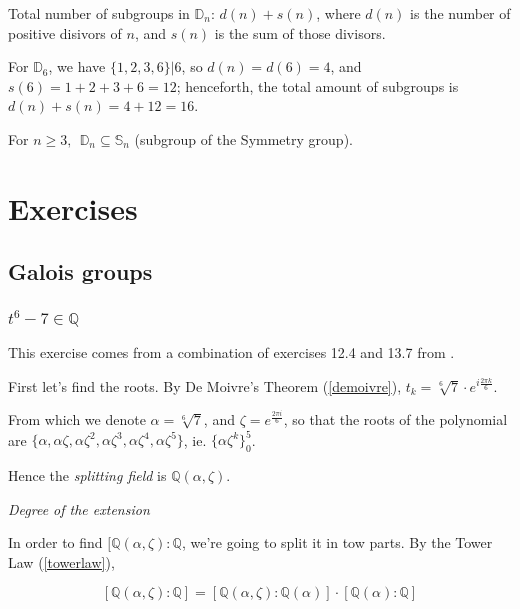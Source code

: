 \documentclass{article}
\theoremstyle{definition}
\newenvironment{eg}[1]
{\renewcommand\theinnereg{#1}\innereg}
{\endinnereg}
\begin{document}
\vspace{0.3cm}
Total number of subgroups in $\mathbb{D}_n$: $d(n) + s(n)$, where $d(n)$ is the number of positive disivors of $n$, and $s(n)$ is the sum of those divisors.

\begin{eg}{}
For $\mathbb{D}_6$, we have $\{1,2,3,6\} | 6$, so $d(n) = d(6) = 4$, and
$s(6) = 1+2+3+6 = 12$; henceforth, the total amount of subgroups is $d(n)+s(n) = 4+12 = 16$.
\end{eg}

\vspace{0.3cm}
For $n \geq 3, ~~\mathbb{D}_n \subseteq \mathbb{S}_n$ (subgroup of the Symmetry group).



\newpage

\section{Exercises}

\subsection{Galois groups}\label{ex:galoisgroups}

\subsubsection[t6-7]{$t^6-7 \in \mathbb{Q}$}

This exercise comes from a combination of exercises 12.4 and 13.7 from \cite{ianstewart}.

First let's find the roots. By De Moivre's Theorem (\ref{demoivre}), $t_k =
\sqrt[6]{7} \cdot e^{i \frac{2 \pi k}{6}}$.

From which we denote $\alpha = \sqrt[6]{7}$, and $\zeta = e^{\frac{2 \pi i}{6}}$, so that the
roots of the polynomial are $\{ \alpha, \alpha \zeta, \alpha \zeta^2, \alpha \zeta^3, \alpha \zeta^4, \alpha \zeta^5\}$, ie. 
$\{ \alpha \zeta^k \}_0^5$.

Hence the \emph{splitting field} is $\mathbb{Q}(\alpha, \zeta)$.

\emph{Degree of the extension}

In order to find $[\mathbb{Q}(\alpha, \zeta) : \mathbb{Q}$, we're going to split it in tow
parts. By the Tower Law (\ref{towerlaw}),

$$[\mathbb{Q}(\alpha, \zeta) : \mathbb{Q}] = [\mathbb{Q}(\alpha, \zeta) : \mathbb{Q}(\alpha)] \cdot [\mathbb{Q}(\alpha) : \mathbb{Q}]$$
\end{document}

